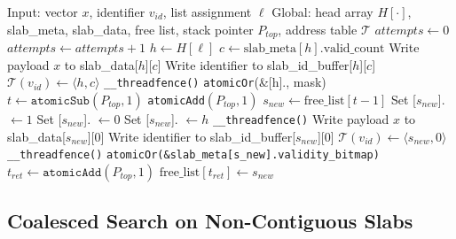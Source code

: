 \documentclass[sigconf,nonacm]{acmart}
\theoremstyle{plain}
\theoremstyle{definition}
\theoremstyle{remark}
\begin{document}
\begin{algorithm}[t]
\caption{Lock-free ingestion protocol in SIVF}
\label{alg:sivf_ingestion}
\begin{algorithmic}[1]
\State Input: vector $x$, identifier $v_{id}$, list assignment $\ell$
\State Global: head array $H[\cdot]$, slab\_meta, slab\_data, free list, stack pointer $P_{top}$, address table $\mathcal{T}$
\State $attempts \gets 0$
    \State $attempts \gets attempts + 1$
    \State $h \gets H[\ell]$
        \State $c \gets \text{slab\_meta}[h].\text{valid\_count}$
                \State Write payload $x$ to slab\_data[$h$][$c$]
                \State Write identifier to slab\_id\_buffer[$h$][$c$]
                \State $\mathcal{T}(v_{id}) \gets \langle h, c \rangle$
                \State \verb|__threadfence()|
                \State \texttt{atomicOr}(\&[h]., mask)
                \State \Return
            \EndIf
        \EndIf
    \EndIf
    \State $t \gets \texttt{atomicSub}(P_{top}, 1)$
        \State \texttt{atomicAdd}$(P_{top}, 1)$
        \State \Return
    \EndIf
    \State $s_{new} \gets \text{free\_list}[t-1]$
    \State Set [$s_{new}$]. $\gets 1$
    \State Set [$s_{new}$]. $\gets 0$
    \State Set [$s_{new}$]. $\gets h$
    \State \verb|__threadfence()|
        \State Write payload $x$ to slab\_data[$s_{new}$][$0$]
        \State Write identifier to slab\_id\_buffer[$s_{new}$][$0$]
        \State $\mathcal{T}(v_{id}) \gets \langle s_{new}, 0 \rangle$
        \State \verb|__threadfence()|
        \State \texttt{atomicOr(\&slab\_meta[s\_new].validity\_bitmap)}
        \State \Return
    \Else
        \State $t_{ret} \gets \texttt{atomicAdd}(P_{top}, 1)$
        \State $\text{free\_list}[t_{ret}] \gets s_{new}$        
    \EndIf
\EndWhile
\end{algorithmic}
\end{algorithm}


\subsection{Coalesced Search on Non-Contiguous Slabs}
\label{sec:methods_search_kernel}
\end{document}
